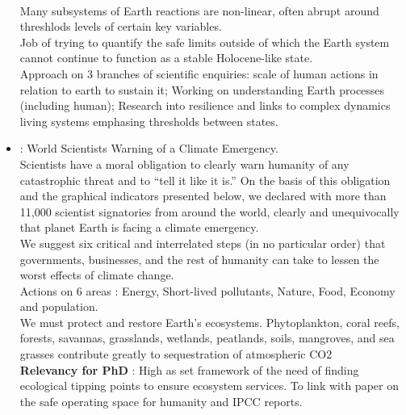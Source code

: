 \documentclass[]{report}
\begin{document}
\begin{itemize}
		\\ Many subsystems of Earth reactions are non-linear, often abrupt around threshlods levels of certain key variables.
		\\Job of trying to quantify the safe limits outside of which the Earth system cannot continue to function as a stable Holocene-like state.
		\\Approach on 3 branches of scientific enquiries: scale of human actions in relation to earth to sustain it; Working on understanding Earth processes (including human); Research into resilience and links to complex dynamics living systems emphasing thresholds between states.
		\item \cite{ripple2019world} : World Scientists Warning of a Climate Emergency.
		\\ Scientists have a moral obligation to clearly warn humanity of any catastrophic threat and to “tell it like it is.” On the basis of this obligation and the graphical indicators presented below, we declared with more than 11,000 scientist signatories from around the world, clearly and unequivocally that planet Earth is facing a climate emergency.
		\\ We suggest six critical and interrelated steps (in no particular order) that governments, businesses, and the rest of humanity can take to lessen the worst effects of climate change.
		\\ Actions on 6 areas : Energy, Short-lived pollutants, Nature, Food, Economy and population.
		\\We must protect and restore Earth’s
		ecosystems. Phytoplankton, coral reefs,
		forests, savannas, grasslands, wetlands,
		peatlands, soils, mangroves, and sea
		grasses contribute greatly to sequestration
		of atmospheric CO2
		\\\textbf{Relevancy for PhD} : High as set framework of the need of finding ecological tipping points to ensure ecosystem services. To link with paper on the safe operating space for humanity and IPCC reports. 



\end{itemize}
\end{document}
